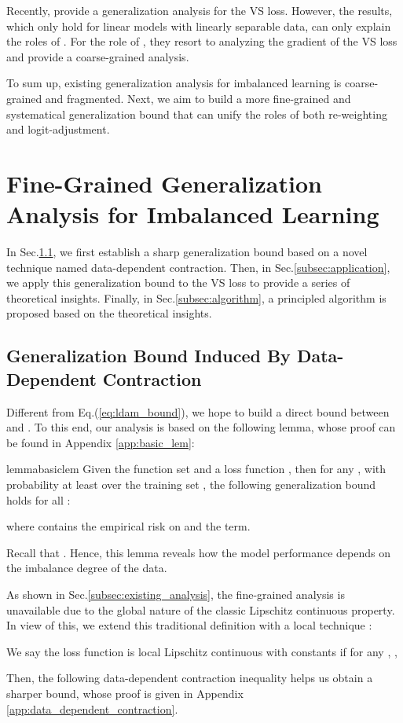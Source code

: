 Recently, \citet{DBLP:conf/nips/KiniPOT21} provide a generalization analysis for the VS loss. However, the results, which only hold for linear models with linearly separable data, can only explain the roles of . For the role of , they resort to analyzing the gradient of the VS loss and provide a coarse-grained analysis.

To sum up, existing generalization analysis for imbalanced learning is coarse-grained and fragmented. Next, we aim to build a more fine-grained and systematical generalization bound that can unify the roles of both re-weighting and logit-adjustment. 

\section{Fine-Grained Generalization Analysis for Imbalanced Learning}
In Sec.\ref{subsec:ddc}, we first establish a sharp generalization bound based on a novel technique named data-dependent contraction. Then, in Sec.\ref{subsec:application}, we apply this generalization bound to the VS loss to provide a series of theoretical insights. Finally, in Sec.\ref{subsec:algorithm}, a principled algorithm is proposed based on the theoretical insights.

\subsection{Generalization Bound Induced By Data-Dependent Contraction}
\label{subsec:ddc}
Different from Eq.(\ref{eq:ldam_bound}), we hope to build a direct bound between  and . To this end, our analysis is based on the following lemma, whose proof can be found in Appendix \ref{app:basic_lem}:
\begin{restatable}{lemma}{basiclem}
    \label{lem:basic_lem}
    Given the function set  and a loss function , then for any , with probability at least  over the training set , the following generalization bound holds for all :
    
    where  contains the empirical risk on  and the  term. 
\end{restatable}
\begin{remark}
    Recall that . Hence, this lemma reveals how the model performance depends on the imbalance degree of the data. 
\end{remark}

As shown in Sec.\ref{subsec:existing_analysis}, the fine-grained analysis is unavailable due to the global nature of the classic Lipschitz continuous property. In view of this, we extend this traditional definition with a local technique \cite{DBLP:conf/colt/BartlettBM02}:
\begin{definition}
    We say the loss function  is local Lipschitz continuous with constants  if for any , , 
    
\end{definition}
\noindent Then, the following data-dependent contraction inequality helps us obtain a sharper bound, whose proof is given in Appendix \ref{app:data_dependent_contraction}.

